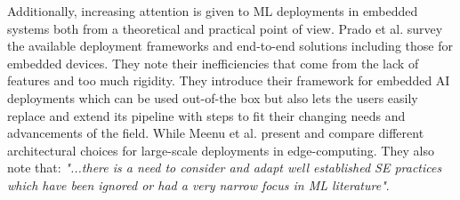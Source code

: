 Additionally, increasing attention is given to ML deployments in embedded systems both from a theoretical \cite{john2020ai} and practical \cite{prado2020bonseyes} point of view. Prado et al. \cite{prado2020bonseyes} survey the available deployment frameworks and end-to-end solutions including those for embedded devices. They note their inefficiencies that come from the lack of features and too much rigidity. They introduce their framework for embedded AI deployments which can be used out-of-the box but also lets the users easily replace and extend its pipeline with steps to fit their changing needs and advancements of the field. While Meenu et al. \cite{john2020ai} present and compare different architectural choices for large-scale deployments in edge-computing. They also note that: \textit{"...there is a need to consider and adapt well established SE practices which have been ignored or had a very narrow focus in ML literature"}.

